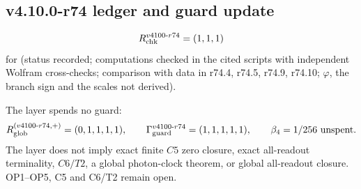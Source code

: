 \subsection*{v4.10.0-r74 ledger and guard update}
\label{subsec:v4100-r74-ledger-guard}

\[
R_{\rm chk}^{v4100\text{-}r74}=(1,1,1)
\]
for (status recorded; computations checked in the cited scripts with independent Wolfram cross-checks; comparison with data in r74.4, r74.5,
r74.9, r74.10; \(\varphi\), the branch sign and the scales not derived).

The layer spends no guard:
\[
R_{\rm glob}^{(v4100\text{-}r74,+)}=(0,1,1,1,1),
\qquad
\Gamma_{\rm guard}^{v4100\text{-}r74}=(1,1,1,1,1),
\qquad
\beta_4=1/256\ \text{unspent}.
\]
The layer does not imply exact finite \(C5\) zero closure, exact all-readout terminality, \(C6/T2\), a global photon-clock theorem,
or global all-readout closure.  OP1--OP5, C5 and C6/T2 remain open.
